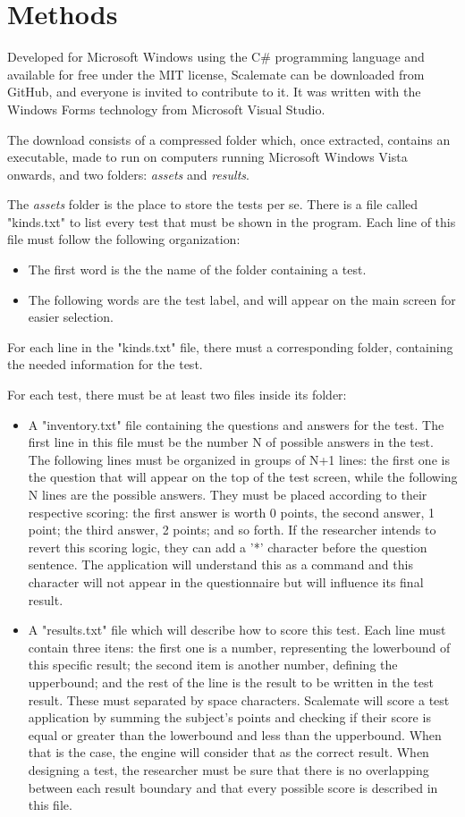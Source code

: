 \documentclass[12pt, a4paper, twoside]{article}
\begin{document}
\section{Methods}

Developed for Microsoft Windows using the C\# programming language and available for free under the MIT license, Scalemate can be downloaded from GitHub, and everyone is invited to contribute to it. It was written with the Windows Forms technology from Microsoft Visual Studio.

The download consists of a compressed folder which, once extracted, contains an executable, made to run on computers running Microsoft Windows Vista onwards, and two folders: \textit{assets} and \textit{results}.

The \textit{assets} folder is the place to store the tests per se. There is a file called "kinds.txt" to list every test that must be shown in the program. Each line of this file must follow the following organization:
\begin{itemize}
\item The first word is the the name of the folder containing a test.
\item The following words are the test label, and will appear on the main screen for easier selection.
\end{itemize}
For each line in the "kinds.txt" file, there must a corresponding folder, containing the needed information for the test.

For each test, there must be at least two files inside its folder:
\begin{itemize}
\item A "inventory.txt" file containing the questions and answers for the test. The first line in this file must be the number N of possible answers in the test. The following lines must be organized in groups of N+1 lines: the first one is the question that will appear on the top of the test screen, while the following N lines are the possible answers. They must be placed according to their respective scoring: the first answer is worth 0 points, the second answer, 1 point; the third answer, 2 points; and so forth. If the researcher intends to revert this scoring logic, they can add a '*' character before the question sentence. The application will understand this as a command and this character will not appear in the questionnaire but will influence its final result.
\item A "results.txt" file which will describe how to score this test. Each line must contain three itens: the first one is a number, representing the lowerbound of this specific result; the second item is another number, defining the upperbound; and the rest of the line is the result to be written in the test result. These must separated by space characters. Scalemate will score a test application by summing the subject's points and checking if their score is equal or greater than the lowerbound and less than the upperbound. When that is the case, the engine will consider that as the correct result. When designing a test, the researcher must be sure that there is no overlapping between each result boundary and that every possible score is described in this file.
\end{itemize}
\end{document}
